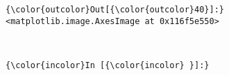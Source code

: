 \documentclass[11pt]{article}
\begin{document}
\begin{Verbatim}[commandchars=\\\{\}]
{\color{outcolor}Out[{\color{outcolor}40}]:} <matplotlib.image.AxesImage at 0x116f5e550>
\end{Verbatim}
            
    \begin{center}
    \end{center}
    { \hspace*{\fill} \\}
    
    \begin{Verbatim}[commandchars=\\\{\}]
{\color{incolor}In [{\color{incolor} }]:} 
\end{Verbatim}


    
    
    
    
\end{document}
